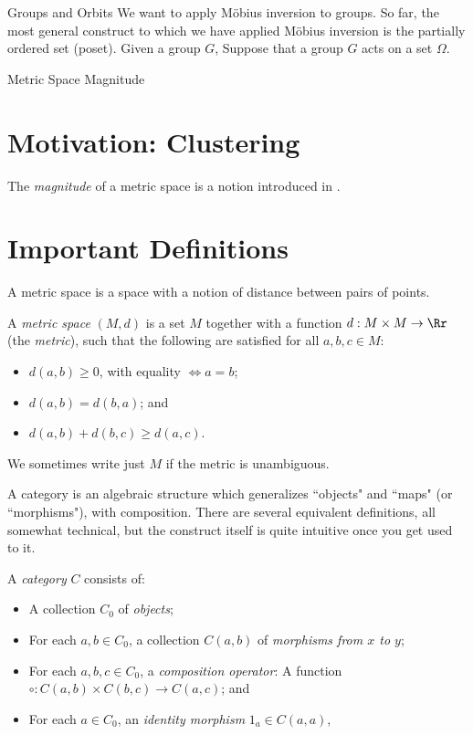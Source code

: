 \documentclass[12pt]{pom_thesis}
\begin{document}
\begin{chapter}{Groups and Orbits} 
We want to apply M\"obius inversion to groups. So far, the most general construct to which we have applied M\"obius inversion is the partially ordered set (poset). Given a group $G$, 
Suppose that a group $G$ acts on a set $\Omega$. 
\end{chapter}

\begin{chapter}{Metric Space Magnitude}
\section{Motivation: Clustering}
The \emph{magnitude} of a metric space is a notion introduced in \cite{Lein2}. %
\section{Important Definitions} \label{mag_defs}
A metric space is a space with a notion of distance between pairs of points. 
\begin{defn}
A \textit{metric space} $(M,d)$ is a set $M$ together with a function  $d:M \times M \rightarrow \Rr$ (the \emph{metric}), such that the following are satisfied for all $a,b,c \in M$:
\begin{itemize}
\item $d(a,b) \geq 0$, with equality $\iff a = b$;
\item $d(a,b) = d(b,a)$; and
\item $d(a,b) + d(b,c) \geq d(a,c)$.
\end{itemize}
We sometimes write just $M$ if the metric is unambiguous.
\end{defn}
A category is an algebraic structure which generalizes ``objects" and ``maps" (or ``morphisms"), with composition. There are several equivalent definitions, all somewhat technical, but the construct itself is quite intuitive once you get used to it.  
\begin{defn}
A \textit{category} $C$ consists of:
\begin{itemize}
\item A collection $C_0$ of \emph{objects};
\item For each $a,b \in C_0$, a collection $C(a,b)$ of \emph{morphisms from $x$ to $y$};
\item For each $a,b,c \in C_0$, a \emph{composition operator}: A function $\circ:C(a,b) \times C(b,c) \rightarrow C(a,c)$; and
\item For each $a \in C_0$, an \emph{identity morphism} $1_a \in C(a,a)$,

\end{itemize}
\end{defn}
\end{chapter}
\end{document}
